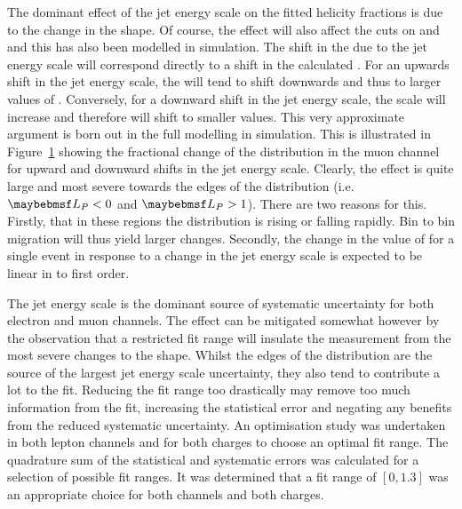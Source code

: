 The dominant effect of the jet energy scale on the fitted helicity fractions is
due to the change in the \LP shape. Of course, the effect will also affect the
cuts on \PtW and \MT and this has also been modelled in simulation. The shift in
the \MET due to the jet energy scale will correspond directly to a shift in the
calculated \LP. For an upwards shift in the jet energy scale, the \MET will tend
to shift downwards and thus to larger values of \LP. Conversely, for a downward
shift in the jet energy scale, the \MET scale will increase and therefore \LP
will shift to smaller values. This very approximate argument is born out in the
full modelling in simulation. This is illustrated in Figure~\ref{fig:wpol_mujecunc}
showing the fractional change of the \LP distribution in the muon channel for
upward and downward shifts in the jet energy scale. Clearly, the effect is quite
large and most severe towards the edges of the \LP distribution (i.e. $\LP < 0$
and $\LP > 1$). There are two reasons for this. Firstly, that in these regions
the \LP distribution is rising or falling rapidly. Bin to bin migration will
thus yield larger changes. Secondly, the change in the value of \LP for a single
event in response to a change in the jet energy scale is expected to be linear
in \LP to first order.

The jet energy scale is the dominant source of systematic uncertainty for both
electron and muon channels. The effect can be mitigated somewhat however by the
observation that a restricted fit range will insulate the measurement from the
most severe changes to the \LP shape. Whilst the edges of the \LP distribution
are the source of the largest jet energy scale uncertainty, they also tend to
contribute a lot to the fit. Reducing the fit range too drastically may remove
too much information from the fit, increasing the statistical error and negating
any benefits from the reduced systematic uncertainty. An optimisation study was
undertaken in both lepton channels and for both charges to choose an optimal fit
range.  The quadrature sum of the statistical and systematic errors was
calculated for a selection of possible fit ranges. It was determined that a fit
range of $[0,1.3]$ was an appropriate choice for both channels and both charges.

\begin{figure}
\centering
{}\quad
{}
\caption{}
\label{fig:wpol_mujecunc}
\end{figure}

